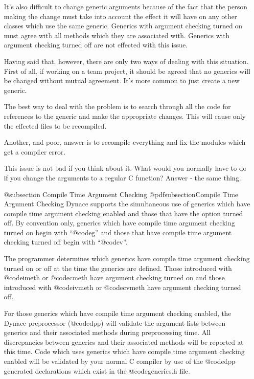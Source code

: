 It's also difficult to change generic arguments because of the fact that
the person making the change must take into account the effect it will
have on any other classes which use the same generic.  Generics with
argument checking turned on must agree with all methods which they are
associated with.  Generics with argument checking turned off are not
effected with this issue.

Having said that, however, there are only two ways of dealing with
this situation.  First of all, if working on a team project, it should
be agreed that no generics will be changed without mutual agreement.
It's more common to just create a new generic.

The best way to deal with the problem is to search through all the
code for references to the generic and make the appropriate changes.
This will cause only the effected files to be recompiled.

Another, and poor, answer is to recompile everything and fix the modules
which get a compiler error.

This issue is not bad if you think about it.  What would you normally
have to do if you change the arguments to a regular C function?  Answer -
the same thing.

@subsection Compile Time Argument Checking
@pdfsubsection{Compile Time Argument Checking}
Dynace supports the simultaneous use of generics which have compile
time argument checking enabled and those that have the option
turned off.  By convention only, generics which have compile time
argument checking turned on begin with ``@code{g}'' and those that
have compile time argument checking turned off begin with ``@code{v}''. 

The programmer determines which generics have compile time argument checking
turned on or off at the time the generics are defined.  Those introduced
with @code{imeth} or @code{cmeth} have argument checking turned on and
those introduced with @code{ivmeth} or @code{cvmeth} have argument checking
turned off.

For those generics which have compile time argument checking enabled,
the Dynace preprocessor (@code{dpp}) will validate the argument lists
between generics and their associated methods during preprocessing time.
All discrepancies between generics and their associated methods will be
reported at this time.  Code which uses generics which have compile time
argument checking enabled will be validated by your normal C compiler by
use of the @code{dpp} generated declarations which exist in the
@code{generics.h} file.

